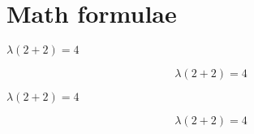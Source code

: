 \documentclass{article}
\begin{document}
\section{Math formulae}

$\lambda (2+2) = 4$

\[\lambda (2+2) = 4\]

\(\lambda (2+2) = 4\)

\begin{displaymath}
\lambda (2+2) = 4
\end{displaymath}
\end{document}
